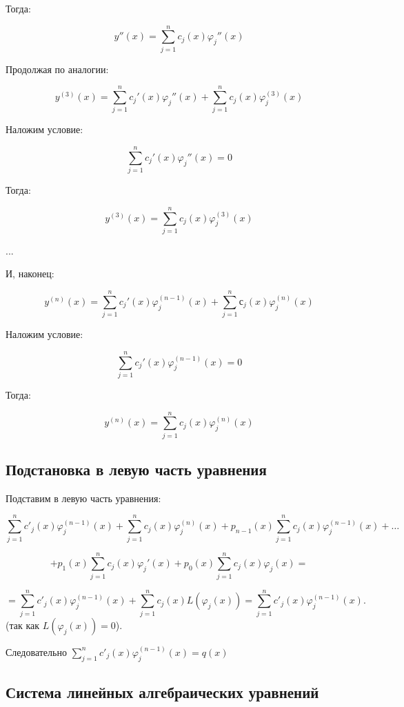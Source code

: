 {Тогда:


\[
y''(x) = \sum_{j=1}^{n} c_j(x) \varphi_j''(x)
\]



Продолжая по аналогии:


\[
y^{(3)}(x) = \sum_{j=1}^{n} c_j'(x) \varphi_j''(x) + \sum_{j=1}^{n} c_j(x) \varphi_j^{(3)}(x)
\]


Наложим условие:


\[
\sum_{j=1}^{n} c_j'(x) \varphi_j''(x) = 0
\]


Тогда:


\[
y^{(3)}(x) = \sum_{j=1}^{n} c_j(x) \varphi_j^{(3)}(x)
\]



...

И, наконец:


\[
y^{(n)}(x) = \sum_{j=1}^{n} c_j'(x) \varphi_j^{(n-1)}(x) + \sum_{j=1}^{n} с_j(x) \varphi_j^{(n)}(x)
\]


Наложим условие:


\[
\sum_{j=1}^{n} c_j'(x) \varphi_j^{(n-1)}(x) = 0
\]


Тогда:


\[
y^{(n)}(x) = \sum_{j=1}^{n} c_j(x) \varphi_j^{(n)}(x)
\]



	\subsection*{Подстановка в левую часть уравнения}

	Подставим в левую часть уравнения:


	\[
	\sum_{j=1}^{n} c'_j(x) \varphi_j^{(n-1)}(x) + \sum_{j=1}^{n} c_j(x) \varphi_j^{(n)}(x) + p_{n-1}(x)\sum_{j=1}^{n} c_j(x) \varphi_j^{(n-1)}(x) + \ldots
	\]




	\[
	+ p_1(x)\sum_{j=1}^{n} c_j(x) \varphi_j'(x) + p_0(x)\sum_{j=1}^{n} c_j(x) \varphi_j(x) =
	\]




	\[
	= \sum_{j=1}^{n} c'_j(x) \varphi_j^{(n-1)}(x) + \sum_{j=1}^{n} c_j(x) L(\varphi_j(x)) = \sum_{j=1}^{n} c'_j(x) \varphi_j^{(n-1)}(x).
	\]
	(так как $L(\varphi_j(x)) = 0$).

	Следовательно $\sum_{j=1}^{n} c'_j(x) \varphi_j^{(n-1)}(x) = q(x)$







	\subsection*{Система линейных алгебраических уравнений}

}
